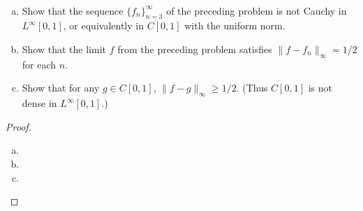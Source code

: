 \begin{pblm}~ %
	\begin{enumerate}[(a)]
	\item Show that the sequence $\{f_n\}_{n=3}^\infty$ of the preceding problem is not 
		Cauchy in $L^\infty[0,1]$, or equivalently in $C[0,1]$ with the uniform norm. 
	\item Show that the limit $f$ from the preceding problem satisfies $\|f - f_n\|_\infty = 1/2$ 
		for each $n$. 
	\item Show that for any $g \in C[0,1]$, $\|f - g\|_\infty \ge 1/2$. (Thus $C[0,1]$ is not 
		dense in $L^\infty[0,1]$.)
	\end{enumerate}
\begin{proof}
	~
	\begin{enumerate}[(a)]
	\item 
	\item 
	\item 
	\end{enumerate}
\end{proof}
\end{pblm}

